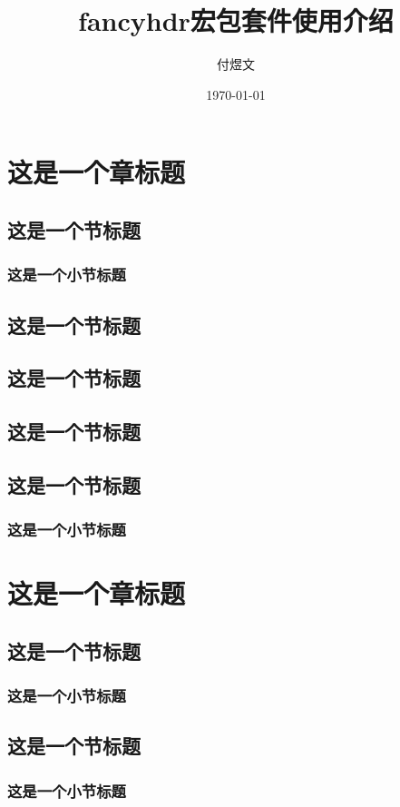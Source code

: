 \documentclass[]{ctexbook}
\title{fancyhdr宏包套件使用介绍}
\author{付煜文}
\date{\today}
\begin{document}
	\maketitle
	
	\newpage
	\chapter{这是一个章标题}
	\section{这是一个节标题}
	\lipsum[1]
	\subsection{这是一个小节标题}
	\lipsum[2]
	\section{这是一个节标题}
	\lipsum[1]
	\section{这是一个节标题}
	\lipsum[3]
	\section{这是一个节标题}
	\lipsum[3]
	\section{这是一个节标题}
	\lipsum[3]
	\subsection{这是一个小节标题}
	\lipsum[2]
	\newpage
	\chapter{这是一个章标题}
	\section{这是一个节标题}
	\lipsum[3]
	\subsection{这是一个小节标题}
	\lipsum[4]
	\section{这是一个节标题}
	\lipsum[1]
	\subsection{这是一个小节标题}
	\lipsum[2]
	
\end{document}
